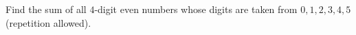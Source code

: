Find the sum of all $4$-digit even numbers whose digits are taken from $0,1,2,3,4,5$ (repetition allowed).
